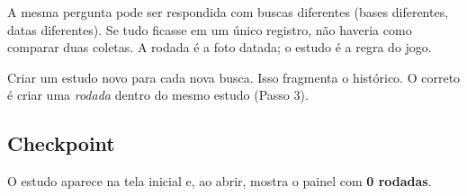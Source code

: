 \begin{nota}
A mesma pergunta pode ser respondida com buscas diferentes (bases diferentes, datas diferentes). Se
tudo ficasse em um único registro, não haveria como comparar duas coletas. A rodada é a foto datada;
o estudo é a regra do jogo.
\end{nota}

\begin{alerta}
Criar um estudo novo para cada nova busca. Isso fragmenta o histórico. O correto é criar uma
\emph{rodada} dentro do mesmo estudo (Passo 3).
\end{alerta}

\subsection*{Checkpoint}
\marcador\; O estudo aparece na tela inicial e, ao abrir, mostra o painel com \textbf{0 rodadas}.
